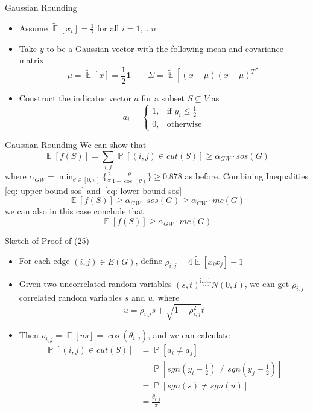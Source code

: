 \documentclass[10pt, xcolor={dvipsnames}]{beamer}
\DeclareMathOperator{\Ex}{\mathbb{E}}
\DeclareMathOperator{\Prob}{\mathbb{P}}
\newcommand{\vect}[1]{\boldsymbol{#1}}
\begin{document}
\begin{frame}{Gaussian Rounding}
\begin{itemize}
\item Assume $\tilde{\Ex}[x_i] = \frac{1}{2}$ for all $i = 1, \dots n$
\item Take $y$ to be a Gaussian vector with the following mean and covariance matrix
\begin{equation}
\mu = \tilde{\Ex}[x] = \frac{1}{2} \vect{1} \qquad \Sigma = \tilde{\Ex}[(x - \mu)(x - \mu)^{T}]
\end{equation}
\item Construct the indicator vector $a$ for a subset $S \subseteq V$ as
\begin{equation}
a_i = \begin{cases}
1,  &\text{if $y_{i} \leq \frac{1}{2}$}\\
0,  &\text{otherwise}
\end{cases}
\end{equation}
\end{itemize}
\end{frame}

\begin{frame}{Gaussian Rounding}
We can show that
\begin{equation}
\Ex[f(S)] = \sum_{i, j}  \Prob[(i, j) \in cut(S)] \geq \alpha_{GW} \cdot 
sos(G)
\label{eq: lower-bound-sos}
\end{equation}
where $\alpha_{GW} = \min_{\theta \in [0, \pi]} \lbrace \frac{2}{\pi}\frac{\theta}{1 - \cos(\theta)} \rbrace \geq 0.878$ as before. Combining Inequalities \ref{eq: upper-bound-sos} and~\ref{eq: lower-bound-sos}
$$
\Ex[f(S)] \geq \alpha_{GW} \cdot sos(G) \geq \alpha_{GW} \cdot mc(G)
$$
we can also in this case conclude that
\begin{equation}
\Ex[f(S)] \geq \alpha_{GW} \cdot mc(G)
\end{equation}
\end{frame}

\begin{frame}{Sketch of Proof of (25)}
\begin{itemize}
\item For each edge $(i, j) \in E(G)$, define $\rho_{i, j} = 4 \tilde{\Ex}[x_{i} x_{j}] - 1$
\item Given two uncorrelated random variables $(s, t) \overset{\text{i.i.d.}}{\sim} N(0, I)$, we can get $\rho_{i, j}$-correlated random variables $s$ and $u$, where
\begin{equation}
u = \rho_{i, j} s + \sqrt{1 - \rho_{i, j}^{2}} t
\end{equation}
\item Then $\rho_{i, j} = \Ex[u s] = \cos(\theta_{i, j})$, and we can calculate
\begin{align*}
\Prob[(i, j) \in cut(S)] 
&= \Prob[a_i \neq a_j]\\
&= \Prob[sgn(y_i - \frac{1}{2}) \neq sgn(y_{j} - \frac{1}{2})] \\
&= \Prob[sgn(s) \neq sgn(u)] \\
&= \frac{\theta_{i, j}}{\pi}
\end{align*}
\end{itemize}
\end{frame}
\end{document}
